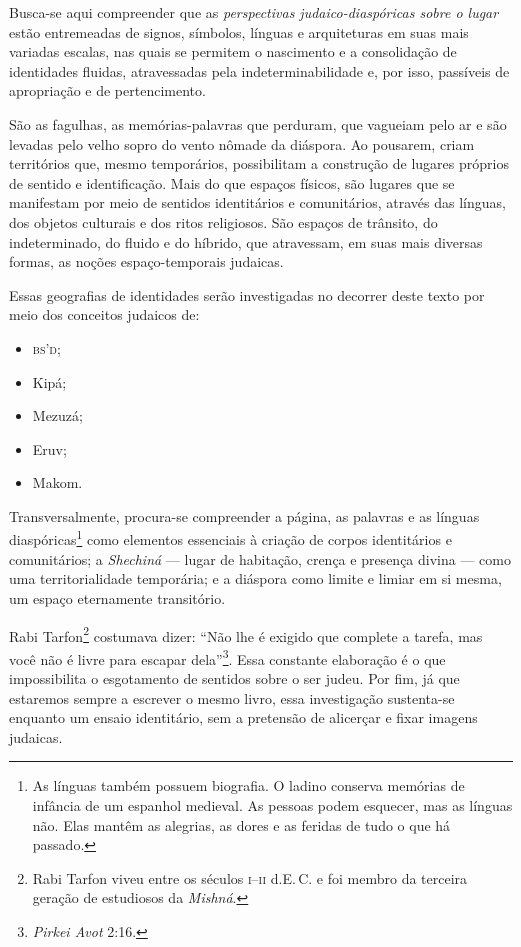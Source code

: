 Busca-se aqui compreender que as \emph{perspectivas judaico-diaspóricas sobre o lugar} estão entremeadas de signos, símbolos, línguas e arquiteturas em suas mais variadas escalas, nas quais se permitem o nascimento e a consolidação de identidades fluidas, atravessadas pela indeterminabilidade e, por isso, passíveis de apropriação e de pertencimento.

São as fagulhas, as memórias-palavras que perduram, que vagueiam pelo ar e são levadas pelo velho sopro do vento nômade da diáspora. Ao pousarem, criam territórios que, mesmo temporários, possibilitam a construção de lugares próprios de sentido e identificação. Mais do que espaços físicos, são lugares que se manifestam por meio de sentidos identitários e comunitários, através das línguas, dos objetos culturais e dos ritos religiosos. São espaços de trânsito, do indeterminado, do fluido e do híbrido, que atravessam, em suas mais diversas formas, as noções espaço-temporais judaicas.

Essas geografias de identidades serão investigadas no decorrer deste texto por meio dos conceitos judaicos de:

\begin{itemize}
\item \textsc{bs'd}; 
\item Kipá; 
\item Mezuzá; 
\item Eruv; 
\item Makom. 
\end{itemize}

Transversalmente, procura-se compreender a página, as palavras e as línguas diaspóricas\footnote{As línguas também possuem biografia. O ladino conserva memórias de infância de um espanhol medieval. As pessoas podem esquecer, mas as línguas não. Elas mantêm as alegrias, as dores e as feridas de tudo o que há passado.} como elementos essenciais à criação de corpos identitários e comunitários; a \emph{Shechiná} --- lugar de habitação, crença e presença divina --- como uma territorialidade temporária; e a diáspora como limite e limiar em si mesma, um espaço eternamente transitório.

Rabi Tarfon\footnote{Rabi Tarfon viveu entre os séculos \textsc{i}--\textsc{ii} d.E.\,C. e foi membro da terceira geração de
  estudiosos da \emph{Mishná}.}
costumava dizer: ``Não lhe é exigido que complete a tarefa, mas
você não é livre para escapar dela''\footnote{\emph{Pirkei Avot} 2:16.}. Essa constante elaboração é o que
impossibilita o esgotamento de sentidos sobre o ser judeu. Por fim, já
que estaremos sempre a escrever o mesmo livro, essa investigação
sustenta-se enquanto um ensaio identitário, sem a pretensão de alicerçar
e fixar imagens judaicas.

